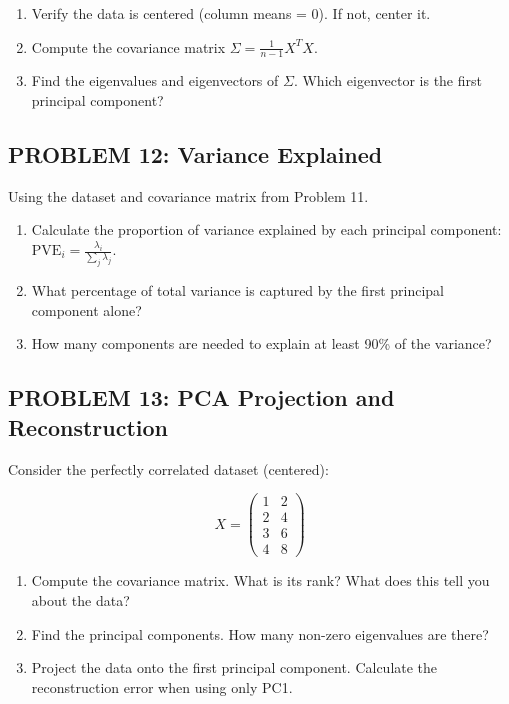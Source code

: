 \documentclass[12pt]{article}
\begin{document}
\begin{enumerate}
\item[(a)] Verify the data is centered (column means = 0). If not, center it.
\item[(b)] Compute the covariance matrix \(\Sigma = \frac{1}{n-1} X^T X\).
\item[(c)] Find the eigenvalues and eigenvectors of \(\Sigma\). Which eigenvector is the first principal component?
\end{enumerate}

\subsection*{PROBLEM 12: Variance Explained}

Using the dataset and covariance matrix from Problem 11.

\begin{enumerate}
\item[(a)] Calculate the proportion of variance explained by each principal component: \(\text{PVE}_i = \frac{\lambda_i}{\sum_j \lambda_j}\).
\item[(b)] What percentage of total variance is captured by the first principal component alone?
\item[(c)] How many components are needed to explain at least 90\% of the variance?
\end{enumerate}

\subsection*{PROBLEM 13: PCA Projection and Reconstruction}

Consider the perfectly correlated dataset (centered):

\[
X = \begin{pmatrix}
1 & 2 \\
2 & 4 \\
3 & 6 \\
4 & 8
\end{pmatrix}
\]

\begin{enumerate}
\item[(a)] Compute the covariance matrix. What is its rank? What does this tell you about the data?
\item[(b)] Find the principal components. How many non-zero eigenvalues are there?
\item[(c)] Project the data onto the first principal component. Calculate the reconstruction error when using only PC1.
\end{enumerate}
\end{document}
